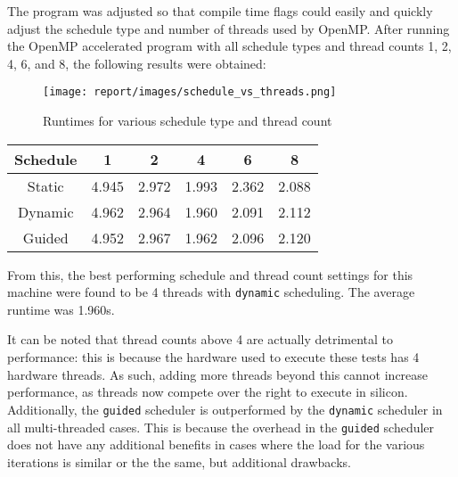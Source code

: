 \documentclass[a4paper]{article}
\begin{document}
            The program was adjusted so that compile time flags could easily and quickly adjust the schedule type and
            number of threads used by OpenMP. After running the OpenMP accelerated program with all schedule types and
            thread counts 1, 2, 4, 6, and 8, the following results were obtained:

            \begin{figure}[!h]
                \centering
                \texttt{[image: report/images/schedule\_vs\_threads.png]}
                \caption{Runtimes for various schedule type and thread count}
            \end{figure}

            \begin{minipage}{\textwidth}
                \centering
                \begin{tabular}{ c c c c c c }
                    Schedule &     1 &     2 &     4 &     6 &     8 \\
                    \hline
                    \hline
                    Static   & 4.945 & 2.972 & 1.993 & 2.362 & 2.088 \\
                    Dynamic  & 4.962 & 2.964 & 1.960 & 2.091 & 2.112 \\
                    Guided   & 4.952 & 2.967 & 1.962 & 2.096 & 2.120 \\
                \end{tabular}
            \end{minipage}
            
            From this, the best performing schedule and thread count settings for this machine were found to be 4
            threads with \texttt{dynamic} scheduling. The average runtime was 1.960s.

            It can be noted that thread counts above 4 are actually detrimental to performance: this is because the
            hardware used to execute these tests has 4 hardware threads. As such, adding more threads beyond this
            cannot increase performance, as threads now compete over the right to execute in silicon. Additionally, the
            \texttt{guided} scheduler is outperformed by the \texttt{dynamic} scheduler in all multi-threaded cases.
            This is because the overhead in the \texttt{guided} scheduler does not have any additional benefits in
            cases where the load for the various iterations is similar or the the same, but additional drawbacks.
\end{document}
